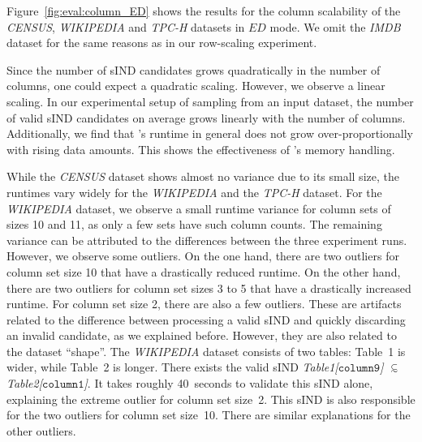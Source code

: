 Figure~\ref{fig:eval:column_ED} shows the results for the column scalability of the \emph{CENSUS}, \emph{WIKIPEDIA} and \emph{TPC-H} datasets in $ED$ mode.
We omit the \emph{IMDB} dataset for the same reasons as in our row-scaling experiment.
%

Since the number of sIND candidates grows quadratically in the number of columns, one could expect a quadratic scaling.
However, we observe a linear scaling.
In our experimental setup of sampling from an input dataset, the number of valid sIND candidates on average grows linearly with the number of columns.
Additionally, we find that \sawfish's runtime in general does not grow over-proportionally with rising data amounts.
This shows the effectiveness of \sawfish's memory handling.

While the \emph{CENSUS} dataset shows almost no variance due to its small size, the runtimes vary widely for the \emph{WIKIPEDIA} and the \emph{TPC-H} dataset.
For the \emph{WIKIPEDIA} dataset, we observe a small runtime variance for column sets of sizes 10 and 11, as only a few sets have such column counts.
The remaining variance can be attributed to the differences between the three experiment runs.
However, we observe some outliers.
On the one hand, there are two outliers for column set size 10 that have a drastically reduced runtime.
On the other hand, there are two outliers for column set sizes 3 to 5 that have a drastically increased runtime.
For column set size 2, there are also a few outliers.
These are artifacts related to the difference between processing a valid sIND and quickly discarding an invalid candidate, as we explained before.
However, they are also related to the dataset ``shape''.
The \emph{WIKIPEDIA} dataset consists of two tables:
Table~1 is wider, while Table~2 is longer.
There exists the valid sIND \emph{Table1[$\mathtt{column9}$]} $\simIND{}$ \emph{Table2[$\mathtt{column1}$]}.
It takes roughly 40~seconds to validate this sIND alone, explaining the extreme outlier for column set size~2.
This sIND is also responsible for the two outliers for column set size~10.
There are similar explanations for the other outliers.

